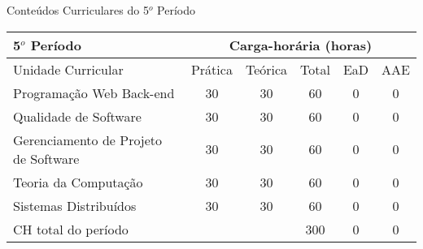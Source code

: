 \begin{quadro}[ht!]
\centering
\caption{Conteúdos Curriculares do 5$^o$ Período}\label{qua:periodo5}
\begin{tabular}{|p{8.0cm}|c|c|c|c|c|}
\hline
\rowcolor{blue1} 5$^o$ Período & \multicolumn{5}{|c|}{\centering Carga-horária (horas)} \\ \hline
\rowcolor{blue1} Unidade Curricular & Prática & Teórica & Total & EaD & AAE \\ \hline
Programação Web Back-end & 30 & 30 & 60 & 0	&	0 \\	\hline
Qualidade de Software & 30 & 30 & 60 & 0	&	0 \\	\hline
Gerenciamento de Projeto de Software & 30 & 30 & 60 & 0	&	0 \\	\hline
Teoria da Computação & 30 & 30 & 60 & 0	&	0 \\	\hline
Sistemas Distribuídos & 30 & 30 & 60 & 0	&	0 \\	\hline
CH total do período & \multicolumn{2}{p{3.3cm}|}{\cellcolor{blue1}} & 300 & 0	&	0 \\ \hline
\end{tabular} \end{quadro}